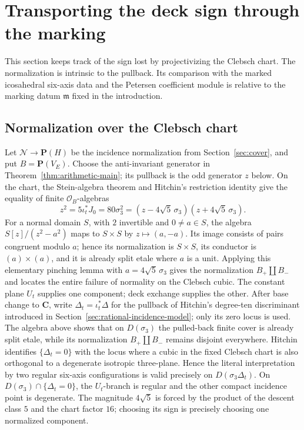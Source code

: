 \section{Transporting the deck sign through the marking}
\label{sec:marked-sheet-transport}

This section keeps track of the sign lost by projectivizing the Clebsch
chart.  The normalization is intrinsic to the pullback.  Its comparison with
the marked icosahedral six-axis data and the Petersen coefficient module is relative to
the marking datum \(\mathfrak m\) fixed in the introduction.

\subsection{Normalization over the Clebsch chart}

Let \(\mathcal N\to\mathbf P(H)\) be the incidence normalization from
Section~\ref{sec:cover}, and put \(B=\mathbf P(V_E)\).  Choose the
anti-invariant generator in Theorem~\ref{thm:arithmetic-main}; its pullback
is the odd generator \(z\) below.  On the chart, the Stein-algebra theorem
and Hitchin's restriction identity give the equality of finite
\(\mathcal O_B\)-algebras
\[
 z^2=5\iota_t^*J_0=80\sigma_3^2
   =(z-4\sqrt5\,\sigma_3)(z+4\sqrt5\,\sigma_3).
\]
For a normal domain \(S\), with \(2\) invertible and \(0\ne a\in S\), the algebra
\(S[z]/(z^2-a^2)\) maps to \(S\times S\) by \(z\mapsto(a,-a)\).  Its image
consists of pairs congruent modulo \(a\); hence its normalization is
\(S\times S\), its conductor is \((a)\times(a)\), and it is already split
etale where \(a\) is a unit.  Applying this elementary pinching lemma with
\(a=4\sqrt5\,\sigma_3\) gives the normalization
\(B_+\amalg B_-\) and locates the entire failure of normality on the
Clebsch cubic.  The constant plane \(U_t\) supplies one component; deck
exchange supplies the other.  After base change to \(\mathbf C\), write
\(\Delta_t=\iota_t^*\Delta\) for the pullback of Hitchin's degree-ten
discriminant introduced in Section~\ref{sec:rational-incidence-model}; only
its zero locus is used.  The algebra above shows that on \(D(\sigma_3)\) the
pulled-back finite cover is already split etale, while its normalization
\(B_+\amalg B_-\) remains disjoint everywhere.  Hitchin
\cite[\S8.2]{HitchinBundles} identifies \(\{\Delta_t=0\}\) with the locus
where a cubic in the fixed Clebsch chart is also orthogonal to a degenerate
isotropic three-plane.  Hence the literal interpretation by two regular
six-axis configurations is valid precisely on \(D(\sigma_3\Delta_t)\).  On
\(D(\sigma_3)\cap\{\Delta_t=0\}\), the \(U_t\)-branch is regular and the
other compact incidence point is degenerate.
The magnitude \(4\sqrt5\) is forced by the product of the descent class
\(5\) and the chart factor \(16\); choosing its sign is precisely choosing
one normalized component.


